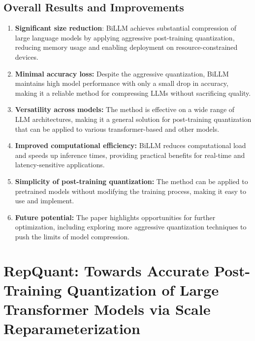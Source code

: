 \documentclass{report}
\begin{document}
	\section{Overall Results and Improvements}
	\begin{enumerate}
		\item 
		\textbf{Significant size reduction}: BiLLM achieves substantial compression of large language models by applying aggressive post-training quantization, reducing memory usage and enabling deployment on resource-constrained devices.
		
		\item
		\textbf{Minimal accuracy loss:} Despite the aggressive quantization, BiLLM maintains high model performance with only a small drop in accuracy, making it a reliable method for compressing LLMs without sacrificing quality.
		
		\item
		\textbf{Versatility across models:} The method is effective on a wide range of LLM architectures, making it a general solution for post-training quantization that can be applied to various transformer-based and other models.
		
		\item
		\textbf{Improved computational efficiency:} BiLLM reduces computational load and speeds up inference times, providing practical benefits for real-time and latency-sensitive applications.
		
		\item
		\textbf{Simplicity of post-training quantization:} The method can be applied to pretrained models without modifying the training process, making it easy to use and implement.
		
		\item
		\textbf{Future potential:} The paper highlights opportunities for further optimization, including exploring more aggressive quantization techniques to push the limits of model compression.
	\end{enumerate}
	
	
	
	
	
	
	
	
	
	\chapter{RepQuant: Towards Accurate Post-Training Quantization of Large Transformer Models via Scale Reparameterization \cite{li2024repquantaccurateposttrainingquantization}}
	
\end{document}
